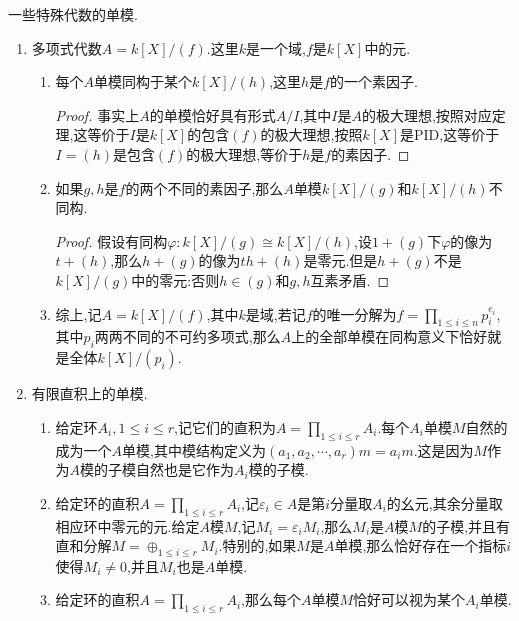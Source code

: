 一些特殊代数的单模.
\begin{enumerate}
	\item 多项式代数$A=k[X]/(f)$.这里$k$是一个域,$f$是$k[X]$中的元.
	\begin{enumerate}
		\item 每个$A$单模同构于某个$k[X]/(h)$,这里$h$是$f$的一个素因子.
		\begin{proof}
			
			事实上$A$的单模恰好具有形式$A/I$,其中$I$是$A$的极大理想,按照对应定理,这等价于$I$是$k[X]$的包含$(f)$的极大理想,按照$k[X]$是PID,这等价于$I=(h)$是包含$(f)$的极大理想,等价于$h$是$f$的素因子.
		\end{proof}
		\item 如果$g,h$是$f$的两个不同的素因子,那么$A$单模$k[X]/(g)$和$k[X]/(h)$不同构.
		\begin{proof}
			
			假设有同构$\varphi:k[X]/(g)\cong k[X]/(h)$,设$1+(g)$下$\varphi$的像为$t+(h)$,那么$h+(g)$的像为$th+(h)$是零元.但是$h+(g)$不是$k[X]/(g)$中的零元:否则$h\in (g)$和$g,h$互素矛盾.
		\end{proof}
		\item 综上,记$A=k[X]/(f)$,其中$k$是域,若记$f$的唯一分解为$f=\prod_{1\le i\le n}p_i^{e_i}$,其中$p_i$两两不同的不可约多项式,那么$A$上的全部单模在同构意义下恰好就是全体$k[X]/(p_i)$.
	\end{enumerate}
	\item 有限直积上的单模.
	\begin{enumerate}
		\item 给定环$A_i,1\le i\le r$,记它们的直积为$A=\prod_{1\le i\le r}A_i$.每个$A_i$单模$M$自然的成为一个$A$单模,其中模结构定义为$(a_1,a_2,\cdots,a_r)m=a_im$.这是因为$M$作为$A$模的子模自然也是它作为$A_i$模的子模.
		\item 给定环的直积$A=\prod_{1\le i\le r}A_i$,记$\varepsilon_i\in A$是第$i$分量取$A_i$的幺元,其余分量取相应环中零元的元.给定$A$模$M$,记$M_i=\varepsilon_iM_i$,那么$M_i$是$A$模$M$的子模,并且有直和分解$M=\oplus_{1\le i\le r}M_i$.特别的,如果$M$是$A$单模,那么恰好存在一个指标$i$使得$M_i\not=0$,并且$M_i$也是$A$单模.
		\item 给定环的直积$A=\prod_{1\le i\le r}A_i$,那么每个$A$单模$M$恰好可以视为某个$A_i$单模.
	\end{enumerate}
\end{enumerate}

